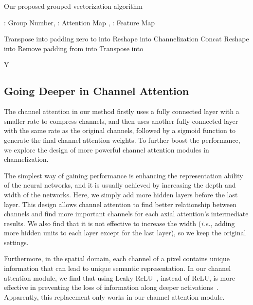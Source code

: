 \documentclass[journal]{IEEEtran}
\begin{document}
\begin{algorithm}
    \small
    \setlength{\abovecaptionskip}{0.1cm}
    \setlength{\belowcaptionskip}{0.1cm}

    \caption{Our proposed grouped vectorization algorithm}

    \begin{algorithmic}[1]
        \Require : Group Number, : Attention Map , : Feature Map 
        
        \State 
        \State  Transpose  into 
        \State 
        \State  padding zero to   into 
        \State  Reshape  into 
        \For{}
            \State  Channelization 
        \EndFor
        \State  Concat
        \State  Reshape   into 
        \State  Remove padding from  into 
        \State  Transpose  into 
        
        \Return Y
    \end{algorithmic}
    \label{alg:groupvect}
\end{algorithm}


\subsection{Going Deeper in Channel Attention}
\label{sGoingDeeper}

The channel attention in our method firstly uses a fully connected layer with a smaller rate to compress channels, and then uses another fully connected layer with the same rate as the original channels, followed by a sigmoid function to generate the final channel attention weights. 
To further boost the performance, we explore the design of more powerful channel attention modules in channelization. 

The simplest way of gaining performance is enhancing the representation ability of the neural networks, and it is usually achieved by increasing the depth and width of the networks. 
Here, we simply add more hidden layers before the last layer. 
This design allows channel attention to find better relationship between channels and find more important channels for each axial attention's intermediate results. 
We also find that it is not effective to increase the width (\textit{i.e.}, adding more hidden units to each layer except for the last layer), so we keep the original settings.

Furthermore, in the spatial domain, each channel of a pixel contains unique information that can lead to unique semantic representation. 
In our channel attention module, we find that using Leaky ReLU~\cite{cLeakyrelu}, instead of ReLU, is more effective in preventing the loss of information along deeper activations~\cite{cMobileNetV2}. 
Apparently, this replacement only works in our channel attention module.
\end{document}
